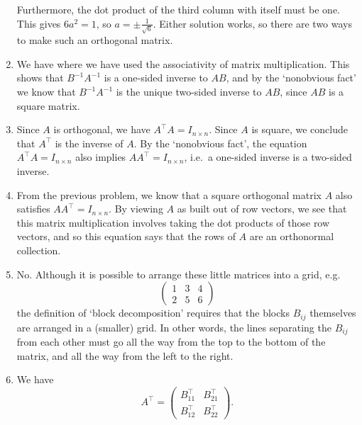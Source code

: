\documentclass[10pt]{amsart}
\theoremstyle{mythm}
\theoremstyle{definition}
\theoremstyle{myrmk}
\begin{document}
\begin{enumerate}
		Furthermore, the dot product of the third column with itself must be one. This gives $6a^2 = 1$, so $a = \pm \frac{1}{\sqrt6}$. Either solution works, so there are two ways to make such an orthogonal matrix. 
		\item We have 
		where we have used the associativity of matrix multiplication. This shows that $B^{-1}A^{-1}$ is a one-sided inverse to $AB$, and by the `nonobvious fact' we know that $B^{-1}A^{-1}$ is the unique two-sided inverse to $AB$, since $AB$ is a square matrix. 
		\item Since $A$ is orthogonal, we have $A^\top A = I_{n \times n}$. Since $A$ is square, we conclude that $A^{\top}$ is the inverse of $A$. By the `nonobvious fact', the equation $A^\top A = I_{n \times n}$ also implies $AA^{\top} = I_{n \times n}$, i.e.\ a one-sided inverse is a two-sided inverse. 
		\item From the previous problem, we know that a square orthogonal matrix $A$ also satisfies $AA^\top = I_{n \times n}$. By viewing $A$ as built out of row vectors, we see that this matrix multiplication involves taking the dot products of those row vectors, and so this equation says that the rows of $A$ are an orthonormal collection. 
		\item No. Although it is possible to arrange these little matrices into a grid, e.g.\ 
		\[
			\begin{pmatrix}
				1 & 3 & 4 \\ 
				2 & 5 & 6
			\end{pmatrix}
		\]
		the definition of `block decomposition' requires that the blocks $B_{ij}$ themselves are arranged in a (smaller) grid. In other words, the lines separating the $B_{ij}$ from each other must go all the way from the top to the bottom of the matrix, and all the way from the left to the right. 
		\item We have 
		\[
			A^\top = \begin{pmatrix}
			B_{11}^\top & B_{21}^\top \\
			B_{12}^\top & B_{22}^\top
			\end{pmatrix}. 
		\]
	\end{enumerate}
\end{document}

